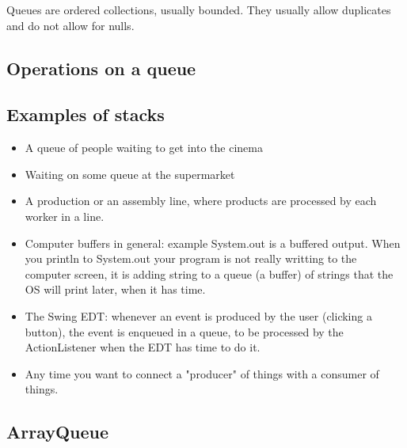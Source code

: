 \documentclass[a4paper, 9pt]{extarticle}
\begin{document}
Queues are ordered collections, usually bounded. They usually allow duplicates
and do not allow for nulls.








\subsection{Operations on a queue}






\subsection{Examples of stacks}

\begin{itemize}

  \item A queue of people waiting to get into the cinema

  \item Waiting on some queue at the supermarket

  \item A production or an assembly line, where products are processed by each worker in a line.

  \item Computer buffers in general: example System.out is a buffered output.
    When you println to System.out your program is not really writting to the
    computer screen, it is adding string to a queue (a buffer) of strings that
    the OS will print later, when it has time.

  \item The Swing EDT: whenever an event is produced by the user (clicking a
    button), the event is enqueued in a queue, to be processed by the
    ActionListener when the EDT has time to do it.

  \item Any time you want to connect a "producer" of things with a consumer of things.

\end{itemize}



\subsection{ArrayQueue}
\end{document}
